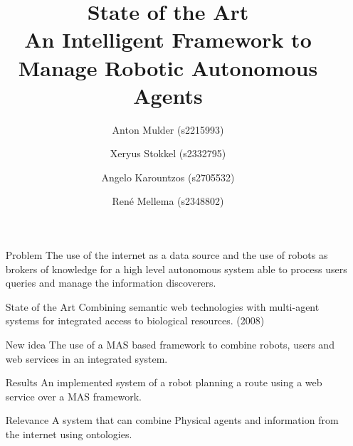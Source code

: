 \documentclass[a4paper,10pt]{article}
\title{State of the Art\\\Huge An Intelligent Framework to Manage Robotic
    Autonomous Agents}
\author{Anton Mulder (s2215993) \and Xeryus Stokkel (s2332795) \and Angelo
    Karountzos (s2705532) \and Ren\'e Mellema (s2348802)}
\date{}
\begin{document}
\maketitle

\begin{itemize}
    \item[Problem] The use of the internet as a data source and the use of
        robots as brokers of knowledge for a high level autonomous system
        able to process users queries and manage the information
        discoverers.

    \item[State of the Art] Combining semantic web technologies with
        multi-agent systems for integrated access to biological resources.
        (2008)

    \item[New idea] The use of a MAS based framework to combine robots,
        users and web services in an integrated system.

    \item[Results] An implemented system of a robot planning a route using
        a web service over a MAS framework.

    \item[Relevance] A system that can combine Physical agents and
        information from the internet using ontologies.

\end{itemize}
\end{document}
